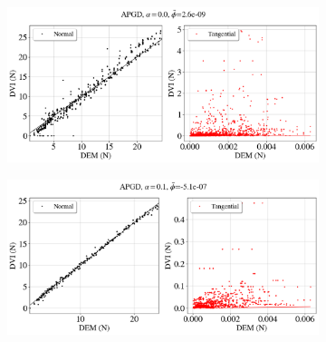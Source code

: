 \begin{itemize}
	\begin{figure}[H]
		\centering	
		\begin{subfigure}{0.9\columnwidth}	
			\centering
			\includegraphics[width=1.0\textwidth]{images/CD/Example7/17_DVI_APGD_al_0_10par.png}
		\end{subfigure}
		
		\begin{subfigure}{0.9\columnwidth}	
			\centering
			\includegraphics[width=1.0\textwidth]{images/CD/Example7/19_DVI_APGD_al_01_10par.png}
		\end{subfigure}
		

\end{figure}
\end{itemize}

